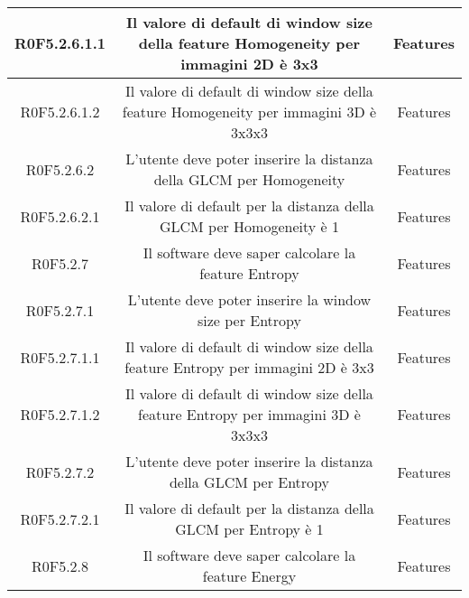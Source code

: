 \begin{center}
\begin{longtable}{|c|c|c|}
\hline
R0F5.2.6.1.1   & \parbox[t]{\larghezza}{Il valore di default di window size della feature Homogeneity per immagini 2D è 3x3 }  & \parbox[t]{\dimFonti}{ Features \\} \\
\hline
R0F5.2.6.1.2   & \parbox[t]{\larghezza}{Il valore di default di window size della feature Homogeneity per immagini 3D è 3x3x3}  & \parbox[t]{\dimFonti}{ Features \\} \\
\hline
R0F5.2.6.2   & \parbox[t]{\larghezza}{L'utente deve poter inserire la distanza della GLCM per Homogeneity}  & \parbox[t]{\dimFonti}{ Features \\} \\
\hline
R0F5.2.6.2.1   & \parbox[t]{\larghezza}{Il valore di default per la distanza della GLCM per Homogeneity è 1}  & \parbox[t]{\dimFonti}{ Features \\} \\
\hline
R0F5.2.7   & \parbox[t]{\larghezza}{Il software deve saper calcolare la feature Entropy}  & \parbox[t]{\dimFonti}{ Features \\} \\
\hline
R0F5.2.7.1   & \parbox[t]{\larghezza}{L'utente deve poter inserire la window size per Entropy}  & \parbox[t]{\dimFonti}{ Features \\} \\
\hline
R0F5.2.7.1.1   & \parbox[t]{\larghezza}{Il valore di default di window size della feature Entropy per immagini 2D è 3x3 }  & \parbox[t]{\dimFonti}{ Features \\} \\
\hline
R0F5.2.7.1.2   & \parbox[t]{\larghezza}{Il valore di default di window size della feature Entropy per immagini 3D è 3x3x3 }  & \parbox[t]{\dimFonti}{ Features \\} \\
\hline
R0F5.2.7.2   & \parbox[t]{\larghezza}{L'utente deve poter inserire la distanza della GLCM per Entropy}  & \parbox[t]{\dimFonti}{ Features \\} \\
\hline
R0F5.2.7.2.1   & \parbox[t]{\larghezza}{Il valore di default per la distanza della GLCM per Entropy è 1}  & \parbox[t]{\dimFonti}{ Features \\} \\
\hline
R0F5.2.8   & \parbox[t]{\larghezza}{Il software deve saper calcolare la feature Energy}  & \parbox[t]{\dimFonti}{ Features \\} \\

\end{longtable}
\end{center}
